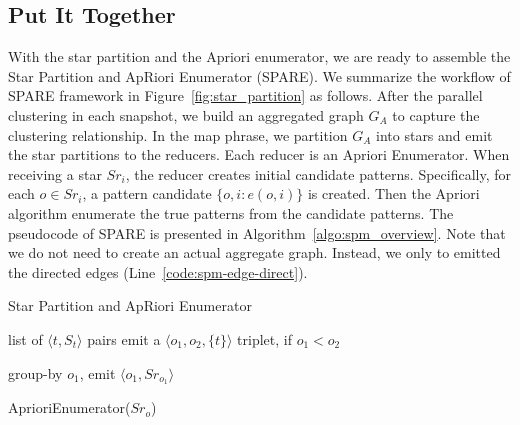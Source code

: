 \subsection{Put It Together}
With the star partition and the Apriori enumerator, we are ready to assemble the Star Partition and ApRiori Enumerator (SPARE). 
We summarize the workflow of SPARE framework in Figure~\ref{fig:star_partition} as follows. After the parallel clustering in each snapshot, we build an aggregated graph $G_A$ to capture the clustering relationship. In the map phrase, we partition $G_A$ into stars and emit the star partitions to the reducers. Each reducer is an Apriori Enumerator. When receiving a star $Sr_i$, the reducer creates initial candidate patterns. Specifically, for each $o \in Sr_i$, a pattern candidate $\{o,i: e(o,i)\}$ is created. Then the Apriori algorithm enumerate the true patterns from the candidate patterns. The pseudocode of SPARE is presented in Algorithm~\ref{algo:spm_overview}. Note that we do not need to create an actual aggregate graph. Instead, we only to emitted the directed edges (Line~\ref{code:spm-edge-direct}).

\begin{algorithm}
\caption{Star Partition and ApRiori Enumerator}
\label{algo:spm_overview}
\begin{algorithmic}[1]
\Require list of $\langle t, S_t \rangle$ pairs
\label{code:spm-map-start}
	\State emit a $\langle o_1, o_2, \{t\}\rangle$ triplet, if $o_1 < o_2$~\label{code:spm-edge-direct}
	\EndFor
\EndFor
\label{code:spm-map-end}

\label{code:spm-shuffle-start}
	\State group-by $o_1$, emit $\langle o_1, Sr_{o_1} \rangle$ 
\EndFor
\label{code:spm-shuffle-end}

\label{code:spm-reduce-start}
\State AprioriEnumerator($Sr_o$)
\EndFor
\label{code:spm-reduce-end}

\end{algorithmic}
\end{algorithm}


